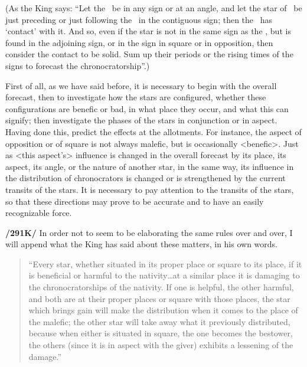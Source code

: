 (As \mndl the King says: “Let the \Moon\, be in any sign or at an angle, and let the star of \Mars\, be just preceding or just following the \Moon\, in the contiguous sign; then the \Moon\, has ‘contact’ with it. And so, even if the star is not in the same sign as the \Moon, but is found in the adjoining sign, or in the sign in square or in opposition, then consider the contact to be solid. Sum up their periods or the rising times of the signs to forecast the chronocratorship”.)

 
First of \mnm all, as we have said before, it is necessary to begin with the overall forecast, then to investigate how the stars are configured, whether these configurations are benefic or bad, in what place they occur, and what this can signify; then investigate the phases of the stars in conjunction or in aspect. Having done this, predict the effects at the allotments. For \mndl instance, the aspect of opposition or of square is not always malefic, but is occasionally <benefic>. Just as <this aspect’s> influence is changed in the overall forecast by its place, its aspect, its angle, or the nature of another star, in the same way, its influence in the distribution of chronocrators is changed or is strengthened by the current transits of the stars. It is necessary to pay attention to the transits of the stars, so that these directions may prove to be accurate and to have an easily recognizable force.

\textbf{/291K/} In order not to seem to be elaborating the same rules over and over, I will append what the King has said about these matters, in his own words.
\begin{quote}
“Every star, whether situated in its proper place or square to its place, if it is beneficial or harmful to the nativity…at a similar place it is damaging to the chronocratorships of the nativity. If one is helpful, the other harmful, and both are at their proper places or square with those places, the star which brings gain will make the distribution when it comes to the place of the malefic; the other star will take away what it previously distributed, because when either is situated in square, the one becomes the bestower, the others (since it is in aspect with the giver) exhibits a lessening of the damage.”
\end{quote}

